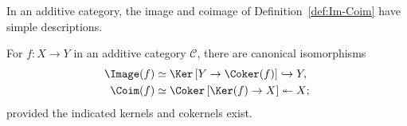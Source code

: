 In an additive category, the image and coimage of Definition~\ref{def:Im-Coim} have simple descriptions.

\begin{proposition}\label{prop:Im-Coim-additive}
	For $f:X\to Y$ in an additive category $\mathcal C$, there are canonical isomorphisms
	\begin{align*}
		\Image(f) & \simeq \Ker\left[ Y \to \Coker(f) \right] \hookrightarrow Y, \\
		\Coim(f) & \simeq \Coker\left[ \Ker(f) \to X \right] \twoheadleftarrow X ;
	\end{align*}
	provided the indicated kernels and cokernels exist.
\end{proposition}

